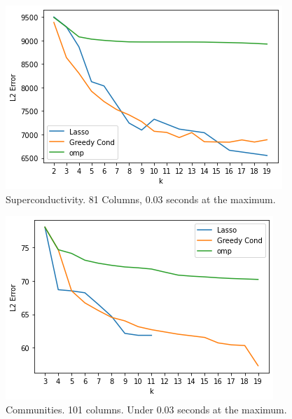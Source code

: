 \documentclass{beamer}
\begin{document}
\begin{frame}
    \begin{figure}[h]
        \centering
        \includegraphics[width=0.8\linewidth]{superconductivity.png}
        \caption{Superconductivity. 81 Columns, 0.03 seconds at the maximum.}%
        \label{fig:superconductivity}
    \end{figure}
\end{frame}
\begin{frame}
    \begin{figure}[h]
        \centering
        \includegraphics[width=0.8\linewidth]{violentcrime.png}
        \caption{Communities. 101 columns. Under 0.03 seconds at the maximum.}%
        \label{fig:name}
    \end{figure}
\end{frame}
\end{document}
